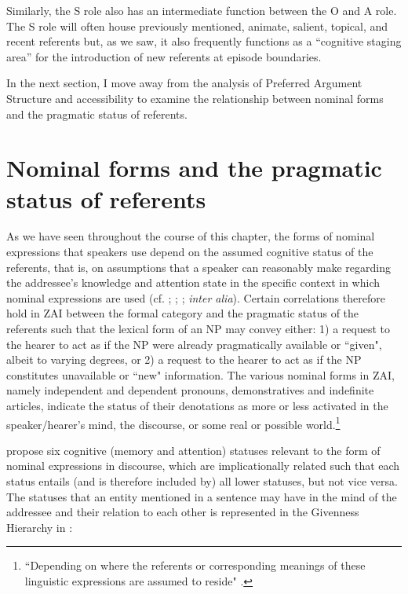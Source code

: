 Similarly, the S role also has an intermediate function between the O and A role. The S role will often house previously mentioned, animate, salient, topical, and recent referents but, as we saw, it also frequently functions as a ``cognitive staging area'' for the introduction of new referents at episode boundaries.

In the next section, I move away from the analysis of Preferred Argument Structure and accessibility to examine the relationship between nominal forms and the pragmatic status of referents.


\section{Nominal forms and the pragmatic status of referents}\label{nomforms}

As we have seen throughout the course of this chapter, the forms of nominal expressions that speakers use depend on the assumed cognitive status of the referents, that is, on assumptions that a speaker can reasonably make regarding the addressee's knowledge and attention state in the specific context in which nominal expressions are used (cf. \citealt{chafe1976}; \citealt{prince1981}; \citealt{ariel1988}; \textit{inter alia}). Certain correlations therefore hold in ZAI between the formal category and the pragmatic status of the referents such that the lexical form of an NP may convey either: 1) a request to the hearer to act as if the NP were already pragmatically available or ``given", albeit  to varying degrees, or 2) a request to the hearer to act as if the NP constitutes unavailable or ``new" information. The various nominal forms in ZAI, namely independent and dependent pronouns, demonstratives and indefinite articles, indicate the status of their denotations as more or less activated in the speaker/hearer's mind, the discourse, or some real or possible world.\footnote{``Depending on where the referents or corresponding meanings of these linguistic expressions are assumed to reside" \citep[177]{gundel2001}.} 

\citet{gundel1993} propose six cognitive (memory and attention) statuses relevant to the form of nominal expressions in discourse, which are implicationally related such that each status entails (and is therefore included by) all lower statuses, but not vice versa. The statuses that an entity mentioned in a sentence may have in the mind of the addressee and their relation to each other is represented in the Givenness Hierarchy in :


